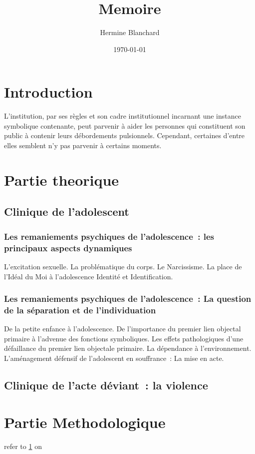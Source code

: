 \documentclass[a4paper, 12pt]{article}
\begin{document}
\title{Memoire}
\author{Hermine Blanchard}
\date{\today}
\maketitle

\section{Introduction}
\label{intro}
L’institution, par ses règles et son cadre institutionnel incarnant une instance symbolique contenante, peut parvenir à aider les personnes qui constituent son  public à contenir leurs débordements pulsionnels. Cependant, certaines d’entre elles semblent n’y pas parvenir à certains moments.

\section{Partie theorique}

\subsection{Clinique de l’adolescent}

\subsubsection{Les remaniements psychiques de l’adolescence : les principaux aspects dynamiques}
L’excitation sexuelle.
La problématique du corps.
Le Narcissisme.
La place de l'Idéal du Moi à l'adolescence
Identité et Identification.

\subsubsection{Les remaniements psychiques de l’adolescence : La question de la séparation et de l’individuation}
De la petite enfance à l’adolescence.
De l’importance du premier lien objectal primaire à l’advenue des fonctions symboliques.
Les effets pathologiques d’une défaillance du premier lien objectale primaire.
La dépendance à l’environnement.
L’aménagement défensif de l’adolescent en souffrance : La mise en acte.

\subsection{Clinique de l’acte déviant : la violence}

\section{Partie Methodologique}
refer to \ref{intro} on \pageref{intro}
\end{document}
